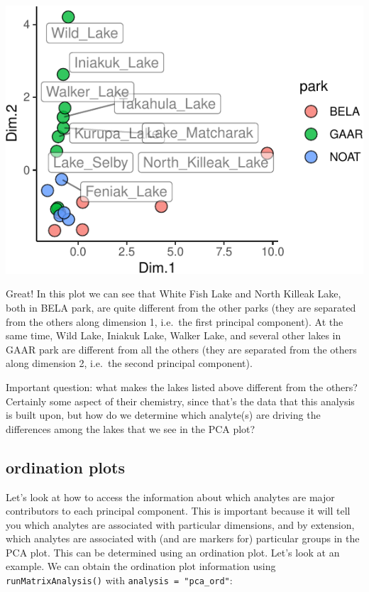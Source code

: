 \documentclass[
]{krantz}
\begin{document}
\begin{center}\includegraphics[width=1\linewidth]{index_files/figure-latex/unnamed-chunk-98-1} \end{center}

Great! In this plot we can see that White Fish Lake and North Killeak Lake, both in BELA park, are quite different from the other parks (they are separated from the others along dimension 1, i.e.~the first principal component). At the same time, Wild Lake, Iniakuk Lake, Walker Lake, and several other lakes in GAAR park are different from all the others (they are separated from the others along dimension 2, i.e.~the second principal component).

Important question: what makes the lakes listed above different from the others? Certainly some aspect of their chemistry, since that's the data that this analysis is built upon, but how do we determine which analyte(s) are driving the differences among the lakes that we see in the PCA plot?

\hypertarget{ordination-plots}{%
\subsection{ordination plots}\label{ordination-plots}}

Let's look at how to access the information about which analytes are major contributors to each principal component. This is important because it will tell you which analytes are associated with particular dimensions, and by extension, which analytes are associated with (and are markers for) particular groups in the PCA plot. This can be determined using an ordination plot. Let's look at an example. We can obtain the ordination plot information using \texttt{runMatrixAnalysis()} with \texttt{analysis\ =\ "pca\_ord"}:
\end{document}
